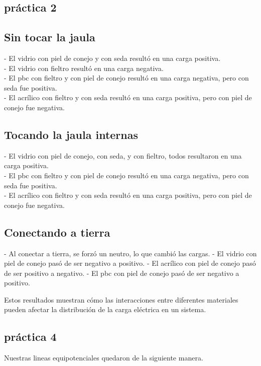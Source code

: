 \documentclass{article}
\begin{document}
\subsection{práctica 2}\label{p2}
\subsection*{Sin tocar la jaula}
- El vidrio con piel de conejo y con seda resultó en una carga positiva.\\
- El vidrio con fieltro resultó en una carga negativa.\\
- El pbc con fieltro y con piel de conejo resultó en una carga negativa, pero con seda fue positiva.\\
- El acrílico con fieltro y con seda resultó en una carga positiva, pero con piel de conejo fue negativa.

\subsection*{Tocando la jaula internas}
- El vidrio con piel de conejo, con seda, y con fieltro, todos resultaron en una carga positiva.\\
- El pbc con fieltro y con piel de conejo resultó en una carga negativa, pero con seda fue positiva.\\
- El acrílico con fieltro y con seda resultó en una carga positiva, pero con piel de conejo fue negativa.

\subsection*{Conectando a tierra}
- Al conectar a tierra, se forzó un neutro, lo que cambió las cargas. 
- El vidrio con piel de conejo pasó de ser negativo a positivo.
- El acrílico con piel de conejo pasó de ser positivo a negativo.
- El pbc con piel de conejo pasó de ser negativo a positivo.

Estos resultados muestran cómo las interacciones entre diferentes materiales pueden afectar la distribución de la carga eléctrica en un sistema.

\subsection{práctica 4}\label{p4}
Nuestras lineas equipotenciales quedaron de la siguiente manera.
\end{document}
